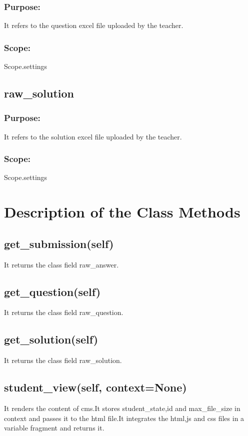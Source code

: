 \documentclass{scrreprt}
\begin{document}
\subsubsection{Purpose:}
It refers to the question excel file uploaded by the teacher.
\subsubsection{Scope:}
Scope.settings

\subsection{raw_solution}
\subsubsection{Purpose:}
It refers to the solution excel file uploaded by the teacher.
\subsubsection{Scope:}
Scope.settings


\section{Description of the Class Methods}


\subsection{get_submission(self)}
It returns the class field raw_answer.

\subsection{get_question(self)}
It returns the class field raw_question.

\subsection{get_solution(self)}
It returns the class field raw_solution.

\subsection{student_view(self, context=None)}
It renders the content of cms.It stores student_state,id and max_file_size in context and passes it to the html file.It integrates
the html,js and css files in a variable fragment and returns it.
\end{document}
